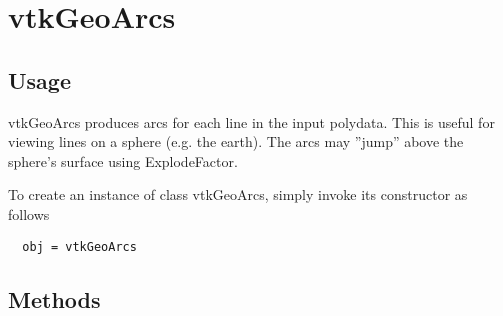 \section{vtkGeoArcs}

\subsection{Usage}

 vtkGeoArcs produces arcs for each line in the input polydata. This is useful
 for viewing lines on a sphere (e.g. the earth). The arcs may ''jump'' above
 the sphere's surface using ExplodeFactor.

To create an instance of class vtkGeoArcs, simply
invoke its constructor as follows
\begin{verbatim}
  obj = vtkGeoArcs
\end{verbatim}
\subsection{Methods}

